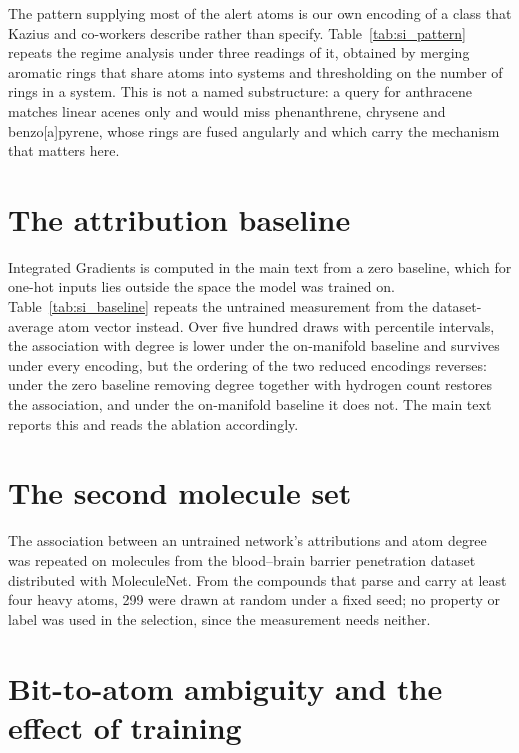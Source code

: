\documentclass[journal=jcisd8,manuscript=suppinfo]{achemso}
\begin{document}
The pattern supplying most of the alert atoms is our own encoding of a class that Kazius and
co-workers describe rather than specify. Table~\ref{tab:si_pattern} repeats the regime
analysis under three readings of it, obtained by merging aromatic rings that share atoms into
systems and thresholding on the number of rings in a system. This is not a named
substructure: a query for anthracene matches linear acenes only and would miss phenanthrene,
chrysene and benzo[a]pyrene, whose rings are fused angularly and which carry the mechanism
that matters here.



\section{The attribution baseline}

Integrated Gradients is computed in the main text from a zero baseline, which for one-hot
inputs lies outside the space the model was trained on. Table~\ref{tab:si_baseline} repeats
the untrained measurement from the dataset-average atom vector instead. Over five hundred draws with percentile intervals, the association with
degree is lower under the on-manifold baseline and survives under every encoding, but the
ordering of the two reduced encodings reverses: under the zero baseline removing degree
together with hydrogen count restores the association, and under the on-manifold baseline it
does not. The main text reports this and reads the ablation accordingly.



\section{The second molecule set}

The association between an untrained network's attributions and atom degree was repeated on
molecules from the blood--brain barrier penetration dataset distributed with MoleculeNet.
From the compounds that parse and carry at least four heavy atoms, 299 were drawn at random
under a fixed seed; no property or label was used in the selection, since the measurement
needs neither.

\section{Bit-to-atom ambiguity and the effect of training}
\end{document}
